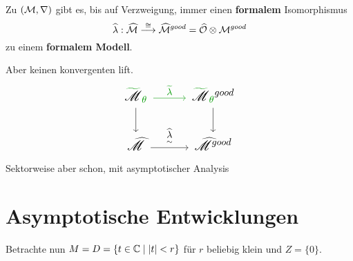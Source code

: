 \begin{tthm}
  Zu 
  $(\mathcal{M},\nabla)$
  gibt es, bis auf Verzweigung, immer einen \textbf{formalem} Isomorphismus
  \[
    \widehat\lambda:\widehat{\mathcal{M}}
    \overset{\cong}\longrightarrow
    \widehat{\mathcal{M}}^{good}
    =\widehat{\mathcal{O}}\otimes\mathcal{M}^{good}
  \]
  zu einem \textbf{formalem Modell}.
  \begin{rem}
    Aber keinen konvergenten lift.
    \[ \Large\begin{tikzcd}
        \textcolor{green!60!black}{\tilde{\textcolor{black}{\sM}}_{\theta}}
        \dar
        \rar[green!60!black]{\tilde\lambda}&
        \textcolor{green!60!black}{%
          \tilde{\textcolor{black}{\sM}}_{\theta}}^{good} \dar
          \\\hat\sM \rar{\underset{\sim}{\hat\lambda}} &
          \hat\sM^{good}
    \end{tikzcd} \]
    \textcolor{green!60!black}{Sektorweise aber schon, mit asymptotischer
    Analysis}
  \end{rem}
\end{tthm}
\pagebreak \section{Asymptotische Entwicklungen} %
Betrachte nun $M=D=\{t\in\mathbb{C}\mid|t|<r\}$ für $r$ beliebig klein und $Z=\{0\}$.
